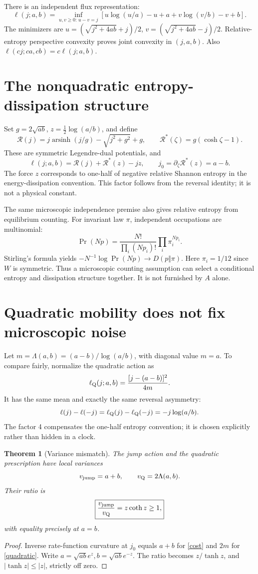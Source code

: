 \documentclass[11pt,a4paper]{article}
\newtheorem{theorem}{Theorem}
\newcommand{\arsinh}{\operatorname{arsinh}}
\begin{document}
There is an independent flux representation:
\[
\ell(j;a,b)=
\inf_{u,v\ge0:\,u-v=j}
\left[u\log(u/a)-u+a+v\log(v/b)-v+b\right].
\]
The minimizers are
\(u=(\sqrt{j^2+4ab}+j)/2\),
\(v=(\sqrt{j^2+4ab}-j)/2\).
Relative-entropy perspective convexity proves joint convexity in
\((j,a,b)\). Also
\(\ell(cj;ca,cb)=c\ell(j;a,b)\).

\section{The nonquadratic entropy-dissipation structure}

Set \(g=2\sqrt{ab}\), \(z=\frac12\log(a/b)\), and define
\[
\mathcal R(j)=j\arsinh(j/g)-\sqrt{j^2+g^2}+g,\qquad
\mathcal R^*(\zeta)=g(\cosh\zeta-1).
\]
These are symmetric Legendre-dual potentials, and
\[
\ell(j;a,b)=\mathcal R(j)+\mathcal R^*(z)-jz,\qquad
j_0=\partial_\zeta\mathcal R^*(z)=a-b.
\]
The force \(z\) corresponds to one-half of negative relative Shannon
entropy in the energy-dissipation convention. This factor follows from
the reversal identity; it is not a physical constant.

The same microscopic independence premise also gives relative entropy from
equilibrium counting. For invariant law \(\pi\), independent occupations
are multinomial:
\[
\Pr(Np)=\frac{N!}{\prod_i(Np_i)!}\prod_i\pi_i^{Np_i}.
\]
Stirling's formula yields
\(-N^{-1}\log\Pr(Np)\to D(p\Vert\pi)\).
Here \(\pi_i=1/12\) since \(W\) is symmetric.
Thus a microscopic counting assumption can select a conditional entropy
and dissipation structure together. It is not furnished by \(A\) alone.

\section{Quadratic mobility does not fix microscopic noise}

Let \(m=\Lambda(a,b)=(a-b)/\log(a/b)\), with diagonal value \(m=a\).
To compare fairly, normalize the quadratic action as
\begin{equation}
\ell_{\rm Q}(j;a,b)=\frac{[j-(a-b)]^2}{4m}. \label{quadratic}
\end{equation}
It has the same mean and exactly the same reversal asymmetry:
\[
\ell(j)-\ell(-j)=\ell_{\rm Q}(j)-\ell_{\rm Q}(-j)
=-j\log(a/b).
\]
The factor 4 compensates the one-half entropy convention; it is chosen
explicitly rather than hidden in a clock.

\begin{theorem}[Variance mismatch]
The jump action and the quadratic prescription have local variances
\[
v_{\rm jump}=a+b,\qquad v_{\rm Q}=2\Lambda(a,b).
\]
Their ratio is
\[
\boxed{\frac{v_{\rm jump}}{v_{\rm Q}}=z\coth z\ge1,}
\]
with equality precisely at \(a=b\).
\end{theorem}
\begin{proof}
Inverse rate-function curvature at \(j_0\) equals \(a+b\) for
\eqref{cost} and \(2m\) for \eqref{quadratic}. Write
\(a=\sqrt{ab}e^z,b=\sqrt{ab}e^{-z}\).
The ratio becomes \(z/\tanh z\), and
\(|\tanh z|\le|z|\), strictly off zero.
\end{proof}
\end{document}
